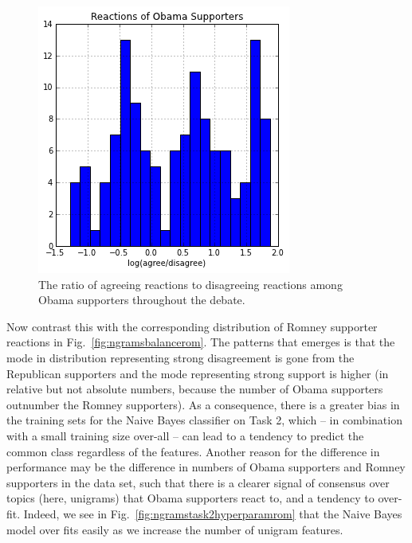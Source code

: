 \begin{figure}[]
	\centering
	\includegraphics[scale=0.60]{Figures/ngrams_balance_oba.png}
	\caption{The ratio of agreeing reactions to disagreeing reactions among Obama supporters throughout the debate.}
	\label{fig:ngramsbalanceoba}
\end{figure}

Now contrast this with the corresponding distribution of Romney supporter reactions in Fig.~\ref{fig:ngramsbalancerom}.  The patterns that emerges is that the mode in distribution representing strong disagreement is gone from the Republican supporters and the mode representing strong support is higher (in relative but not absolute numbers, because the number of Obama supporters outnumber the Romney supporters).  As a consequence, there is a greater bias in the training sets for the Naive Bayes classifier on Task 2, which -- in combination with a small training size over-all -- can lead to a tendency to predict the common class regardless of the features.  Another reason for the difference in performance may be the difference in numbers of Obama supporters and Romney supporters in the data set, such that there is a clearer signal of consensus over topics (here, unigrams) that Obama supporters react to, and a tendency to over-fit.  Indeed, we see in Fig.~\ref{fig:ngramstask2hyperparamrom} that the Naive Bayes model over fits easily as we increase the number of unigram features.

